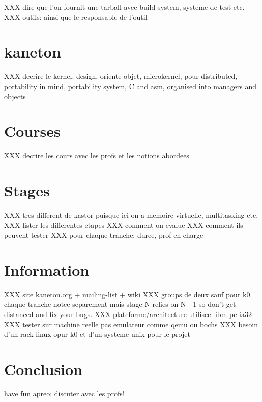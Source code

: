 XXX dire que l'on fournit une tarball avec build system, systeme de test
  etc.
XXX outils: ainsi que le responsable de l'outil

%
%

\section{kaneton}

XXX decrire le kernel: design, oriente objet, microkernel, pour distributed,
  portability in mind, portability system, C and asm, organised into managers
  and objects

%
%

\section{Courses}

XXX decrire les cours avec les profs et les notions abordees

%
%

\section{Stages}

XXX tres different de kastor puisque ici on a memoire virtuelle, multitasking
  etc.
XXX lister les differentes etapes
XXX comment on evalue
XXX comment ils peuvent tester
XXX pour chaque tranche: duree, prof en charge
%
%

\section{Information}

XXX site kaneton.org + mailing-list + wiki
XXX groups de deux sauf pour k0. chaque tranche notee separement mais stage N
  relies on N - 1 so don't get distanced and fix your bugs.
XXX plateforme/architecture utilisee: ibm-pc ia32
XXX tester sur machine reelle pas emulateur comme qemu ou bochs
XXX besoin d'un rack linux opur k0 et d'un systeme unix pour le projet

%
%

\section{Conclusion}

have fun
apreo: discuter avec les profs!


